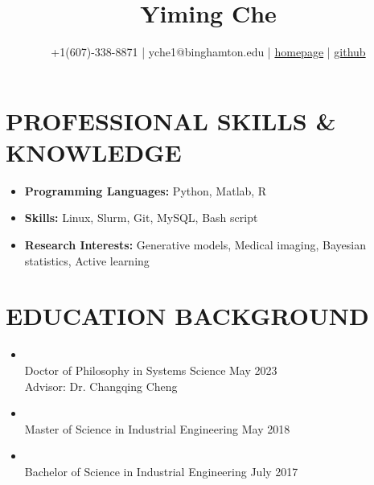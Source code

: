 \documentclass[10pt]{article}
\title{\bf  Yiming Che \vspace{-0.6em}}
\author{+1(607)-338-8871 | yche1@binghamton.edu | \href{https://soloche.github.io}{homepage} | \href{https://github.com/SoloChe}{github}}
\date{}
\begin{document}
	\maketitle

\vspace{-5em}

\section*{PROFESSIONAL SKILLS \& KNOWLEDGE}
 \begin{itemize}	
 	\item {\bf Programming Languages:} Python, Matlab, R
 	\item {\bf Skills:} Linux, Slurm, Git, MySQL, Bash script
 	\item {\bf Research Interests:} Generative models, Medical imaging, Bayesian statistics, Active learning
 \end{itemize}

\section*{EDUCATION BACKGROUND}
\begin{itemize}
		\item {}                                                           
		\\Doctor of Philosophy in Systems Science \hfill May 2023 
		\\Advisor: Dr. Changqing Cheng

	\item {}                                                           
	\\Master of Science in Industrial Engineering \hfill  May 2018
	
    \item {}
            \\Bachelor of Science in Industrial Engineering \hfill July 2017 
\end{itemize}
\end{document}

